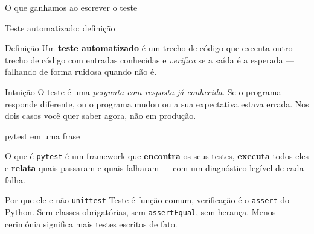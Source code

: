 \documentclass[aspectratio=169]{beamer}
\begin{document}
\begin{frame}{O que ganhamos ao escrever o teste}
  \begin{center}
  \end{center}
\end{frame}

\begin{frame}{Teste automatizado: definição}
  \begin{block}{Definição}
    Um \textbf{teste automatizado} é um trecho de código que executa
    outro trecho de código com entradas conhecidas e \emph{verifica}
    se a saída é a esperada --- falhando de forma ruidosa quando não é.
  \end{block}
  \begin{exampleblock}{Intuição}
    O teste é uma \emph{pergunta com resposta já conhecida}. Se o
    programa responde diferente, ou o programa mudou ou a sua
    expectativa estava errada. Nos dois casos você quer saber agora,
    não em produção.
  \end{exampleblock}
\end{frame}

\begin{frame}{pytest em uma frase}
  \begin{block}{O que é}
    \texttt{pytest} é um framework que \textbf{encontra} os seus testes,
    \textbf{executa} todos eles e \textbf{relata} quais passaram e quais
    falharam --- com um diagnóstico legível de cada falha.
  \end{block}
  \begin{exampleblock}{Por que ele e não \texttt{unittest}}
    Teste é função comum, verificação é o \texttt{assert} do Python.
    Sem classes obrigatórias, sem \texttt{assertEqual}, sem herança.
    Menos cerimônia significa mais testes escritos de fato.
  \end{exampleblock}
\end{frame}
\end{document}
